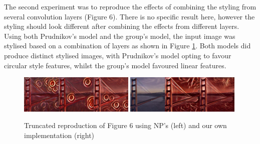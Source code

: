 \documentclass{article} %
\begin{document}
The second experiment was to reproduce the effects of combining the styling from several convolution layers (Figure 6). There is no specific result here, however the styling should look different after combining the effects from different layers. Using both Prudnikov's model and the group's model, the input image was stylised based on a combination of layers as shown in Figure \ref{fig6}. Both models did produce distinct stylised images, with Prudnikov's model opting to favour circular style features, whilst the group's model favoured linear features.

\begin{figure}[h!]
    \centering
    \includegraphics[width=0.49\textwidth, scale=0.1]{fig6_old_small.png}
    \includegraphics[width=0.49\textwidth, scale=0.1]{fig6_ours_small.png}
    \vspace{-3mm}
    \caption{Truncated reproduction of Figure 6 using NP's (left) and our own implementation (right)}
    \label{fig6}
\end{figure}
\end{document}
